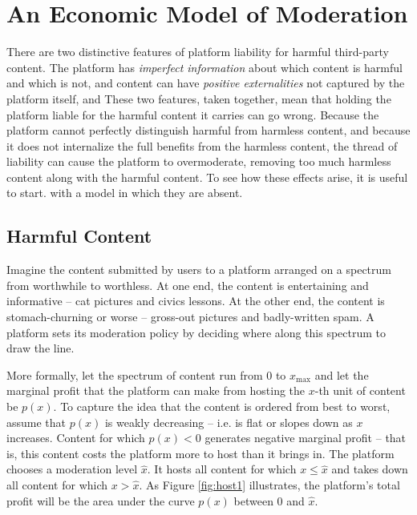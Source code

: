 \newcommand{\xmax}{x_{\text{max}}}
\newcommand{\xbi}{x_{\text{BI}}^*}
\newcommand{\xsl}{x_{\text{SL}}^*}
\newcommand{\xsubi}{x_{\text{I}}^*}

\section{An Economic Model of Moderation}
\label{sec:model}

There are two distinctive features of platform liability for harmful third-party content. The platform has \emph{imperfect information} about which content is harmful and which is not, and  content can have \emph{positive externalities} not captured by the platform itself, and  These two features, taken together, mean that holding the platform liable for the harmful content it carries can go wrong. Because the platform cannot perfectly distinguish harmful from harmless content, and because it does not internalize the full benefits from the harmless content, the thread of liability can cause the platform to overmoderate, removing too much harmless content along with the harmful content. To see how these effects arise, it is useful to start. with a model in which they are absent.


\subsection{Harmful Content}

Imagine the content submitted by users to a platform arranged on a spectrum from worthwhile to worthless. At one end, the content is entertaining and informative -- cat pictures and civics lessons. At the other end, the content is stomach-churning or worse -- gross-out pictures and badly-written spam. A platform sets its moderation policy by deciding where along this spectrum to draw the line.

More formally, let the spectrum of content run from $0$ to $\xmax$ and let the marginal profit that the platform can make from hosting the $x$-th unit of content be $p(x)$. To capture the idea that the content is ordered from best to worst, assume that $p(x)$ is weakly decreasing -- i.e. is flat or slopes down as $x$ increases. Content for which $p(x) <0$ generates negative marginal profit -- that is, this content costs the platform more to host than it brings in. The platform chooses a moderation level $\hat{x}$. It hosts all content for which $x \le \hat{x}$ and takes down all content for which $x > \hat{x}$. As Figure \ref{fig:host1} illustrates, the platform's total profit will be the area under the curve $p(x)$ between $0$ and $\hat{x}$. 



